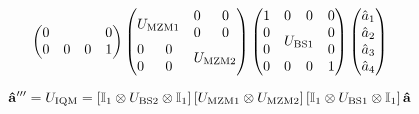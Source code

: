 \begin{equation}
\begin{split}
\begin{pmatrix}
			 0 & & & 0 \\
			 0 & 0 & 0 & 1
		\end{pmatrix}
		\begin{pmatrix}
			 \multicolumn{2}{c}{\multirow{2}{*}{$U_\text{MZM1}$}} & 0 & 0 \\
			 & & 0 & 0 \\
			 0 & 0 & \multicolumn{2}{c}{\multirow{2}{*}{$U_\text{MZM2}$}} \\
			 0 & 0 & & \\
		\end{pmatrix}
		\begin{pmatrix}
			 1 & 0 & 0 & 0 \\
			 0 & \multicolumn{2}{c}{\multirow{2}{*}{$U_\text{BS1}$}} & 0 \\
			 0 & & & 0 \\
			 0 & 0 & 0 & 1
		\end{pmatrix}
		\begin{pmatrix}
			\hat{a}_1 \\
			\hat{a}_2 \\
			\hat{a}_3 \\
			\hat{a}_4
		\end{pmatrix}
	\end{split}
\end{equation}

\begin{equation}
	\vb{\hat{a}}^{\prime\prime\prime}
	=
	U_\text{IQM}
	=
	\left[
		\mathbb{I}_1
		\otimes
		U_\text{BS2}
		\otimes
		\mathbb{I}_1
	\right]
	\left[
		U_\text{MZM1}
		\otimes
		U_\text{MZM2}
	\right]
	\left[
		\mathbb{I}_1
		\otimes
		U_\text{BS1}
		\otimes
		\mathbb{I}_1
	\right]
	\vb{\hat{a}}
\end{equation}

